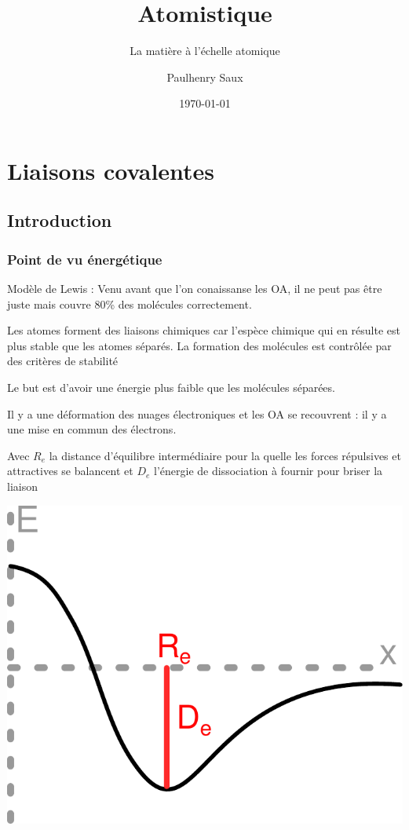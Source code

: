 \documentclass[french]{yLectureNote}
\title{Atomistique}
\subtitle{La matière à l'échelle atomique}
\author{Paulhenry Saux}
\date{\today}
\begin{document}
\setcounter{chapter}{2}
\chapter{Liaisons covalentes}
\section{Introduction}
\subsection{Point de vu énergétique}
Modèle de Lewis : Venu avant que l'on conaissanse les OA, il ne peut pas \^etre juste mais couvre 80\% des molécules correctement.

Les atomes forment des liaisons chimiques car l'espèce chimique qui en résulte est plus stable que les atomes séparés. La formation des molécules est contrôlée par des critères de stabilité

Le but est d'avoir une énergie plus faible que les molécules séparées.

Il y a une déformation des nuages électroniques et les OA se recouvrent : il y a une mise en commun des électrons.

Avec $R_e$ la distance d’équilibre intermédiaire pour la quelle les forces
répulsives et attractives se balancent et $D_e$ l'énergie de dissociation à fournir pour briser la liaison

\includegraphics[scale=0.45]{schema1}
\end{document}

